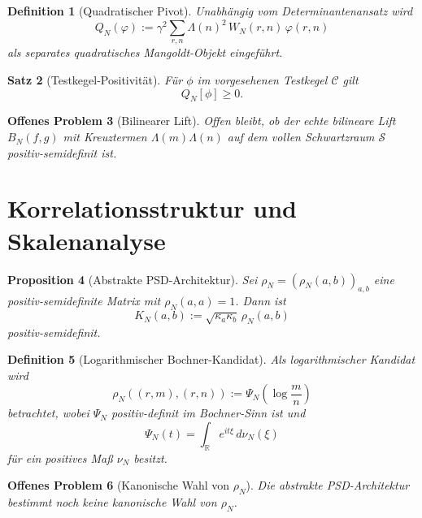 \documentclass[11pt,a4paper]{amsart}
\newtheorem{theorem}{Satz}[section]
\newtheorem{proposition}[theorem]{Proposition}
\newtheorem{definition}[theorem]{Definition}
\newtheorem{openproblem}[theorem]{Offenes Problem}
\begin{document}
\begin{definition}[Quadratischer Pivot]\label{def:quadratic-pivot}
Unabhängig vom Determinantenansatz wird
\[
  Q_N(\varphi)
  :=\gamma^2\sum_{r,n}\Lambda(n)^2\,W_N(r,n)\,\varphi(r,n)
\]
als separates quadratisches Mangoldt-Objekt eingeführt.
\end{definition}

\begin{theorem}[Testkegel-Positivität]\label{thm:test-cone}
Für $\phi$ im vorgesehenen Testkegel $\mathcal C$ gilt
\[
  Q_N[\phi]\ge 0.
\]
\end{theorem}

\begin{openproblem}[Bilinearer Lift]\label{op:bilinear-lift}
Offen bleibt, ob der echte bilineare Lift $B_N(f,g)$ mit Kreuztermen
$\Lambda(m)\Lambda(n)$ auf dem vollen Schwartzraum $\mathcal S$
positiv-semidefinit ist.
\end{openproblem}

\section{Korrelationsstruktur und Skalenanalyse}

\begin{proposition}[Abstrakte PSD-Architektur]\label{prop:psd-architecture}
Sei $\rho_N=(\rho_N(a,b))_{a,b}$ eine positiv-semidefinite Matrix mit
$\rho_N(a,a)=1$. Dann ist
\[
  K_N(a,b):=\sqrt{\kappa_a\kappa_b}\,\rho_N(a,b)
\]
positiv-semidefinit.
\end{proposition}

\begin{definition}[Logarithmischer Bochner-Kandidat]\label{def:bochner-candidate}
Als logarithmischer Kandidat wird
\[
  \rho_N((r,m),(r,n))
  :=\Psi_N\!\left(\log\frac{m}{n}\right)
\]
betrachtet, wobei $\Psi_N$ positiv-definit im Bochner-Sinn ist und
\[
  \Psi_N(t)=\int_{\mathbb R}e^{it\xi}\,d\nu_N(\xi)
\]
für ein positives Maß $\nu_N$ besitzt.
\end{definition}

\begin{openproblem}[Kanonische Wahl von $\rho_N$]\label{op:rho-canonical}
Die abstrakte PSD-Architektur bestimmt noch keine kanonische Wahl von $\rho_N$.
\end{openproblem}
\end{document}
